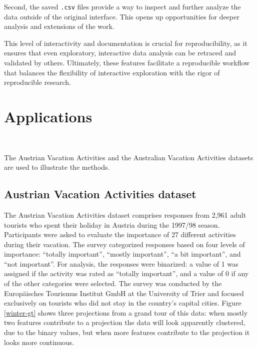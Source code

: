 \documentclass[article]{ajs}
\begin{document}
Second, the saved \texttt{.csv} files provide a way to inspect and further analyze the data outside of the original interface. This opens up opportunities for deeper analysis and extensions of the work.

This level of interactivity and documentation is crucial for reproducibility, as it ensures that even exploratory, interactive data analysis can be retraced and validated by others. Ultimately, these features facilitate a reproducible workflow that balances the flexibility of interactive exploration with the rigor of reproducible research.


\section{Applications}~\label{applications}

The Austrian Vacation Activities \citep{dolnicar2003winter} and the Australian Vacation Activities \cite{cliff2009formative} datasets are used to illustrate the methods.

\subsection{Austrian Vacation Activities dataset}

The Austrian Vacation Activities dataset comprises responses from 2,961 adult tourists who spent their holiday in Austria during the 1997/98 season. Participants were asked to evaluate the importance of 27 different activities during their vacation. The survey categorized responses based on four levels of importance: ``totally important'', ``mostly important'', ``a bit important'', and ``not important''. For analysis, the responses were binarized: a value of 1 was assigned if the activity was rated as ``totally important'', and a value of 0 if any of the other categories were selected. The survey was conducted by the Europäisches Tourismus Institut GmbH at the University of Trier and focused exclusively on tourists who did not stay in the country's capital cities. Figure \ref{winter-gt} shows three projections from a grand tour of this data: when mostly two features contribute to a projection the data will look apparently clustered, due to the binary values, but when more features contribute to the projection it looks more continuous. 
\end{document}
